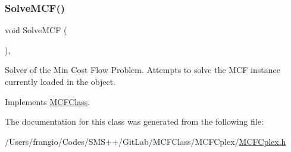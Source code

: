 \subsubsection{\texorpdfstring{Solve\+M\+C\+F()}{SolveMCF()}}
{\footnotesize\ttfamily void Solve\+M\+CF (\begin{DoxyParamCaption}\item[{void}]{ }\end{DoxyParamCaption})\hspace{0.3cm}{\ttfamily [override]}, {\ttfamily [virtual]}}

Solver of the Min Cost Flow Problem. Attempts to solve the M\+CF instance currently loaded in the object. 

Implements \mbox{\hyperlink{class_m_c_f_class_ac0d96429d896a2d878a5f057535ab1ee}{M\+C\+F\+Class}}.



The documentation for this class was generated from the following file\+:\begin{DoxyCompactItemize}
\item 
/\+Users/frangio/\+Codes/\+S\+M\+S++/\+Git\+Lab/\+M\+C\+F\+Class/\+M\+C\+F\+Cplex/\mbox{\hyperlink{_m_c_f_cplex_8h}{M\+C\+F\+Cplex.\+h}}\end{DoxyCompactItemize}
